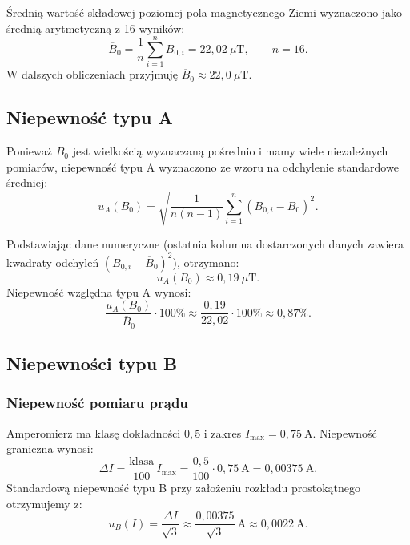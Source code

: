 \documentclass{fizykalab}
\begin{document}
Średnią wartość składowej poziomej pola magnetycznego Ziemi
wyznaczono jako średnią arytmetyczną z 16 wyników:
\begin{equation}
  \overline{B}_0 =
  \frac{1}{n}\sum_{i=1}^{n} B_{0,i}
  = 22{,}02~\mu\text{T},
  \qquad n = 16.
\end{equation}
W dalszych obliczeniach przyjmuję
\(\overline{B}_0 \approx 22{,}0~\mu\text{T}\).

\subsection{Niepewność typu A}

Ponieważ \(B_0\) jest wielkością wyznaczaną pośrednio i mamy
wiele niezależnych pomiarów, niepewność typu A wyznaczono
ze wzoru na odchylenie standardowe średniej:
\begin{equation}
  u_A(B_0) =
  \sqrt{
    \frac{1}{n(n-1)}
    \sum_{i=1}^{n}
    \left(B_{0,i} - \overline{B}_0\right)^2
  }.
\end{equation}

Podstawiając dane numeryczne (ostatnia kolumna dostarczonych
  danych zawiera kwadraty odchyleń
\(\left(B_{0,i} - \overline{B}_0\right)^2\)), otrzymano:
\begin{equation}
  u_A(B_0) \approx 0{,}19~\mu\text{T}.
\end{equation}
Niepewność względna typu A wynosi:
\begin{equation}
  \frac{u_A(B_0)}{\overline{B}_0}\cdot 100\%
  \approx
  \frac{0{,}19}{22{,}02}\cdot 100\%
  \approx 0{,}87\%.
\end{equation}

\subsection{Niepewności typu B}

\subsubsection*{Niepewność pomiaru prądu}

Amperomierz ma klasę dokładności \(0{,}5\) i zakres
\(I_{\max} = 0{,}75~\text{A}\). Niepewność graniczna wynosi:
\begin{equation}
  \Delta I = \frac{\text{klasa}}{100}\,I_{\max}
  = \frac{0{,}5}{100}\cdot 0{,}75~\text{A}
  = 0{,}00375~\text{A}.
\end{equation}
Standardową niepewność typu B przy założeniu rozkładu
prostokątnego otrzymujemy z:
\begin{equation}
  u_B(I) = \frac{\Delta I}{\sqrt{3}}
  \approx \frac{0{,}00375}{\sqrt{3}}~\text{A}
  \approx 0{,}0022~\text{A}.
\end{equation}
\end{document}
